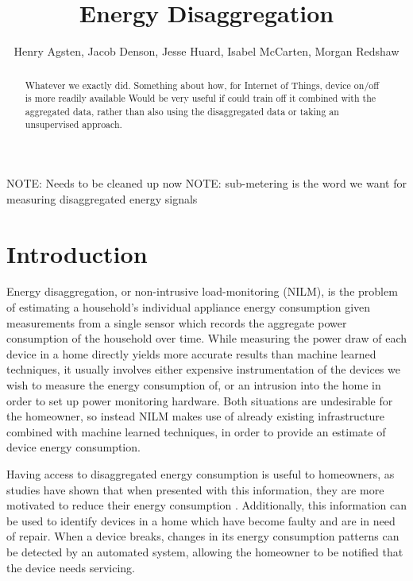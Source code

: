 \documentclass{article}
\title{Energy Disaggregation}
\author{Henry Agsten, Jacob Denson, Jesse Huard, Isabel McCarten, Morgan Redshaw}
\date{}
\begin{document}
\maketitle

\begin{abstract}
Whatever we exactly did. Something about how, for Internet of Things, device on/off is more readily available
Would be very useful if could train off it combined with the aggregated data, rather than also using the disaggregated data or taking an unsupervised approach.
\end{abstract}

NOTE: Needs to be cleaned up now
NOTE: sub-metering is the word we want for measuring disaggregated energy signals

\section{Introduction}

Energy disaggregation, or non-intrusive load-monitoring (NILM), is the problem of estimating a household's individual appliance energy consumption given measurements from a single sensor which records the aggregate power consumption of the household over time.
While measuring the power draw of each device in a home directly yields more accurate results than machine learned techniques, it usually involves either expensive instrumentation of the devices we wish to measure the energy consumption of, or an intrusion into the home in order to set up power monitoring hardware.
Both situations are undesirable for the homeowner, so instead NILM makes use of already existing infrastructure combined with machine learned techniques, in order to provide an estimate of device energy consumption.

Having access to disaggregated energy consumption is useful to homeowners, as studies have shown that when presented with this information, they are more motivated to reduce their energy consumption \cite{Darby}.
Additionally, this information can be used to identify devices in a home which have become faulty and are in need of repair.
When a device breaks, changes in its energy consumption patterns can be detected by an automated system, allowing the homeowner to be notified that the device needs servicing.
\end{document}
